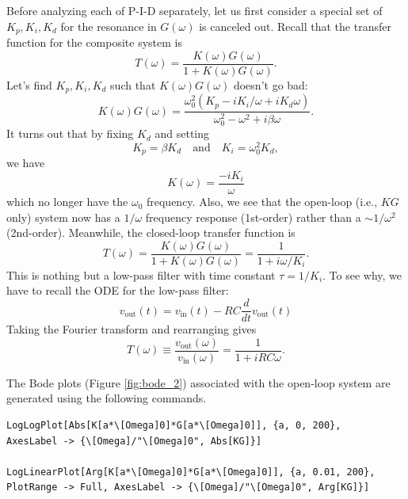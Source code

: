 \documentclass{article}
\theoremstyle{definition}
\newcommand{\f}[2]{\frac{#1}{#2}}
\begin{document}
Before analyzing each of P-I-D separately, let us first consider a special set of $K_p, K_i, K_d$ for the resonance in $G(\omega)$ is canceled out. Recall that the transfer function for the composite system is 
\begin{equation*}
T(\omega) = \f{K(\omega)G(\omega)}{1+K(\omega) G(\omega)}.
\end{equation*}
Let's find $K_p, K_i,K_d$ such that $K(\omega) G(\omega)$ doesn't go bad:
\begin{equation*}
K(\omega) G(\omega) = \f{\omega_0^2( K_p - iK_i/\omega + iK_d \omega)}{\omega_0^2 - \omega^2 + i\beta \omega}.
\end{equation*}
It turns out that by fixing $K_d$ and setting 
\begin{equation*}
K_p  =\beta K_d \quad \text{and} \quad K_i = \omega_0^2 K_d,
\end{equation*}
we have
\begin{equation*}
K(\omega) = \f{-iK_i}{\omega}
\end{equation*}
which no longer have the $\omega_0$ frequency. Also, we see that the open-loop (i.e., $KG$ only) system now has a $1/\omega$ frequency response (1st-order) rather than a $\sim 1/\omega^2$ (2nd-order). Meanwhile, the closed-loop transfer function is 
\begin{equation*}
T(\omega) = \f{K(\omega)G(\omega)}{1+ K(\omega) G(\omega)} = \f{1}{1+ i\omega/K_i}.
\end{equation*}
This is nothing but a low-pass filter with time constant $\tau = 1/K_i$. To see why, we have to recall the ODE for the low-pass filter: 
\begin{equation*}
v_\text{out}(t) = v_\text{in} (t) - RC \f{d}{dt}v_\text{out}(t)
\end{equation*}
Taking the Fourier transform and rearranging gives
\begin{equation*}
T(\omega) \equiv \f{v_\text{out}(\omega)}{v_\text{in}(\omega)} = \f{1}{1+iRC \omega}.
\end{equation*}

The Bode plots (Figure \ref{fig:bode_2}) associated with the open-loop system are generated using the following commands. 
\begin{lstlisting}
LogLogPlot[Abs[K[a*\[Omega]0]*G[a*\[Omega]0]], {a, 0, 200}, 
AxesLabel -> {\[Omega]/"\[Omega]0", Abs[KG]}]

LogLinearPlot[Arg[K[a*\[Omega]0]*G[a*\[Omega]0]], {a, 0.01, 200}, 
PlotRange -> Full, AxesLabel -> {\[Omega]/"\[Omega]0", Arg[KG]}]
\end{lstlisting}
\end{document}
